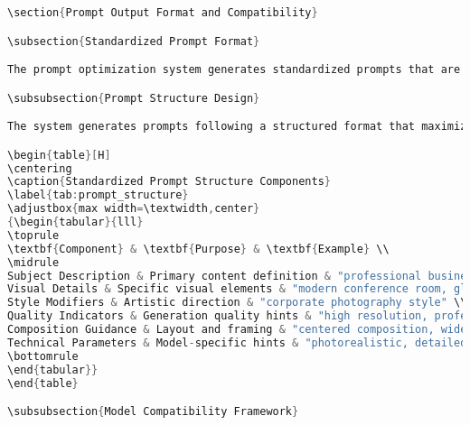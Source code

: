 \begin{table}[H]
\begin{table}[H]
\begin{lstlisting}[language=C,basicstyle=\footnotesize\ttfamily,frame=single,breaklines=true,columns=flexible,caption={Simple Caching Implementation},label={lst:simple_caching}]
\section{Prompt Output Format and Compatibility}

\subsection{Standardized Prompt Format}

The prompt optimization system generates standardized prompts that are compatible with various text-to-image generation models. The output format follows established conventions for prompt structure while incorporating model-specific optimizations for enhanced effectiveness.

\subsubsection{Prompt Structure Design}

The system generates prompts following a structured format that maximizes effectiveness across different image generation models:

\begin{table}[H]
\centering
\caption{Standardized Prompt Structure Components}
\label{tab:prompt_structure}
\adjustbox{max width=\textwidth,center}
{\begin{tabular}{lll}
\toprule
\textbf{Component} & \textbf{Purpose} & \textbf{Example} \\
\midrule
Subject Description & Primary content definition & "professional business meeting" \\
Visual Details & Specific visual elements & "modern conference room, glass table" \\
Style Modifiers & Artistic direction & "corporate photography style" \\
Quality Indicators & Generation quality hints & "high resolution, professional lighting" \\
Composition Guidance & Layout and framing & "centered composition, wide angle" \\
Technical Parameters & Model-specific hints & "photorealistic, detailed textures" \\
\bottomrule
\end{tabular}}
\end{table}

\subsubsection{Model Compatibility Framework}


\end{lstlisting}
\end{table}
\end{table}
